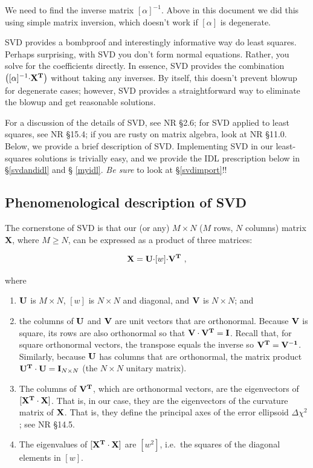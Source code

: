 \documentclass[psfig,preprint]{aastex}
\begin{document}
\noindent We need to find the inverse matrix $[\alpha]^{-1}$. Above in
this document we did this using simple matrix inversion, which doesn't
work if $[\alpha]$ is degenerate. 

	SVD provides a bombproof and interestingly informative way do
least squares.  Perhaps surprising, with SVD you don't form normal
equations.  Rather, you solve for the coefficients directly.  In
essence, SVD provides the combination $\left( [\alpha]^{-1} {\bf \cdot
X^T} \right)$ without taking any inverses.  By itself, this doesn't
prevent blowup for degenerate cases; however, SVD provides a
straightforward way to eliminate the blowup and get reasonable
solutions.

For a discussion of the details of SVD, see NR \S 2.6; for SVD applied
to least squares, see NR \S 15.4; if you are rusty on matrix algebra,
look at NR \S 11.0. Below, we provide a brief description of
SVD. Implementing SVD in our least-squares solutions is trivially easy,
and we provide the IDL prescription below in \S \ref{svdandidl} and \S
\ref{myidl}.  {\it Be sure} to look at \S \ref{svdimport}!!

\subsection{Phenomenological description of SVD} \label{svdphenom}

The cornerstone of SVD is that our (or any) $M \times N$ ($M$ rows, $N$
columns) matrix {\bf X}, where $M \ge N$, can be expressed as a product
of three matrices:

\begin{equation} \label{basicsvd}
{\bf X} = {\bf U \cdot} [ w ] {\bf \cdot V^T}
\ ,
\end{equation}

\noindent where \begin{enumerate}

\item $\bf U$ is $M \times N$, $[w]$ is $N \times N$ and diagonal, and
  $\bf V$ is $N \times N$; and

\item the columns of $\bf U$ and $\bf V$ are unit vectors that are
  orthonormal. Because $\bf V$ is square, its rows are also orthonormal
  so that ${\bf V \cdot V^T = I}$. Recall that, for square orthonormal
  vectors, the transpose equals the inverse so $\bf V^T =
  V^{-1}$. Similarly, because ${\bf U}$ has columns that are
  orthonormal, the matrix product ${\bf U^T \cdot U = I}_{N \times N}$
  (the $N \times N$ unitary matrix).

\item The columns of $\bf V^T$, which are orthonormal vectors, are the
  eigenvectors of ${\bf [X^T \cdot X]}$. That is, in our case, they are
  the eigenvectors of the curvature matrix of $\bf X$. That is, they
  define the principal axes of the error ellipsoid $\Delta \chi^2$; see
  NR \S14.5. 

\item The eigenvalues of ${\bf [X^T \cdot X]}$ are $[w^2]$, i.e.\ the
  squares of the diagonal elements in $[w]$.

\end{enumerate}
\end{document}
